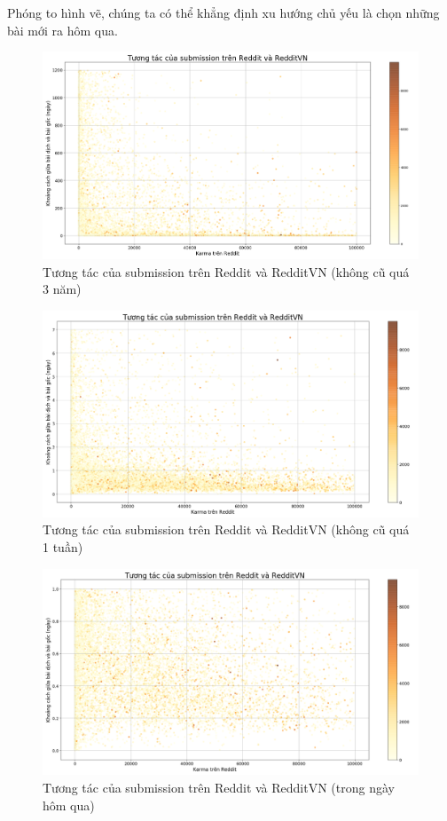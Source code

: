 \documentclass[10pt,a4paper]{article}
\begin{document}
Phóng to hình vẽ, chúng ta có thể khẳng định xu hướng chủ yếu là chọn những bài mới ra hôm qua.
\begin{figure}[!hb]
    \centering
    \includegraphics[width=\textwidth]{img/InterestComparision_1200D.png}
    \caption{Tương tác của submission trên Reddit và RedditVN (không cũ quá 3 năm)}
    \label{fig:interestcomparision2}
\end{figure}
\begin{figure}[!h]
    \centering
    \includegraphics[width=\textwidth]{img/InterestComparision_7D.png}
    \caption{Tương tác của submission trên Reddit và RedditVN (không cũ quá 1 tuần)}
    \label{fig:interestcomparision3}
\end{figure}
\begin{figure}[!h]
    \centering
    \includegraphics[width=\textwidth]{img/InterestComparision_1D.png}
    \caption{Tương tác của submission trên Reddit và RedditVN (trong ngày hôm qua)}
    \label{fig:interestcomparision3}
\end{figure}
\end{document}
